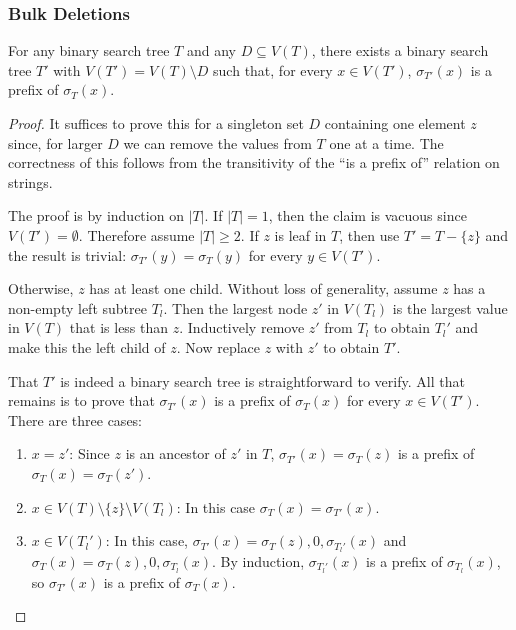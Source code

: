 \documentclass[kpfonts]{patmorin}
\begin{document}
\subsubsection{Bulk Deletions}

\begin{lem}
  For any binary search tree $T$ and any $D\subseteq V(T)$, there exists a binary search tree $T'$ with $V(T')=V(T)\setminus D$ such that, for every $x\in V(T')$, $\sigma_{T'}(x)$ is a prefix of $\sigma_{T}(x)$.
\end{lem}

\begin{proof}
  It suffices to prove this for a singleton set $D$ containing one element $z$ since, for larger $D$ we can remove the values from $T$ one at a time.  The correctness of this follows from the transitivity of the ``is a prefix of'' relation on strings.
  
  The proof is by induction on $|T|$. If $|T|=1$, then the claim is vacuous since $V(T')=\emptyset$.  Therefore assume $|T|\ge 2$.  If $z$ is leaf in $T$, then use $T'=T-\{z\}$ and the result is trivial: $\sigma_{T'}(y)=\sigma_T(y)$ for every $y\in V(T')$.  
  
  Otherwise, $z$ has at least one child.  Without loss of generality, assume $z$ has a non-empty left subtree $T_l$.  Then the largest node $z'$ in $V(T_l)$ is the largest value in $V(T)$ that is less than $z$. Inductively remove $z'$ from $T_l$ to obtain $T_l'$ and make this the left child of $z$.  Now replace $z$ with $z'$ to obtain $T'$.  
  
  That $T'$ is indeed a binary search tree is straightforward to verify.  All that remains is to prove that $\sigma_{T'}(x)$ is a prefix of $\sigma_T(x)$ for every $x\in V(T')$. There are three cases:
  \begin{enumerate}
    \item $x=z'$: Since $z$ is an ancestor of $z'$ in $T$, $\sigma_{T'}(x)=\sigma_T(z)$ is a prefix of $\sigma_T(x)=\sigma_T(z')$.  
    
    \item $x\in V(T)\setminus\{z\}\setminus V(T_l)$: In this case $\sigma_T(x)=\sigma_{T'}(x)$.  
    
    \item $x\in V(T_l')$: In this case, $\sigma_{T'}(x)=\sigma_{T}(z),0,\sigma_{T_l'}(x)$ and $\sigma_T(x)=\sigma_{T}(z),0,\sigma_{T_l}(x)$.  By induction, $\sigma_{T_l'}(x)$ is a prefix of $\sigma_{T_l}(x)$, so $\sigma_{T'}(x)$ is a prefix of $\sigma_T(x)$. \qedhere
  \end{enumerate}
\end{proof}
\end{document}
